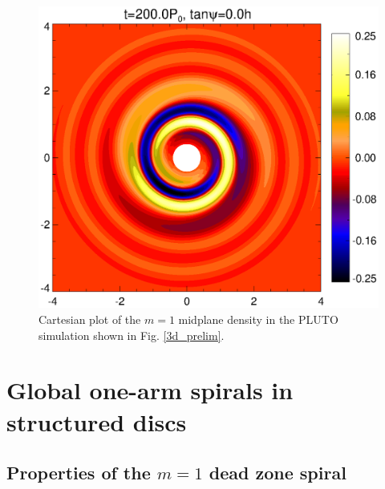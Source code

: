 \begin{figure}
  \includegraphics[width=\linewidth]{figures/pdiskxy_020_m1}
  \caption{Cartesian plot of the $m=1$ midplane density in the PLUTO
    simulation shown in Fig. \ref{3d_prelim}.\label{pluto_cart}}   
\end{figure} 


\section{Global one-arm spirals in structured discs}

\subsection{Properties of the $m=1$ dead zone spiral}


